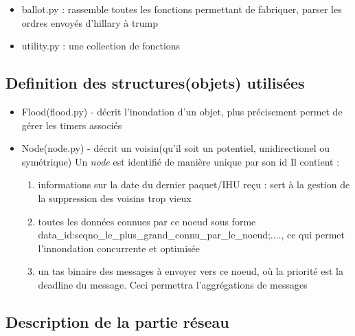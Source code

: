 \documentclass{article}
\begin{document}
\begin{itemize}
\begin{itemize}
  \item ballot.py :  rassemble toutes les fonctions permettant de fabriquer, parser les ordres envoyés d'hillary à trump
  \item utility.py : une collection de fonctions
 \end{itemize}
\end{itemize}

\subsection{Definition des structures(objets) utilisées}
\begin{itemize}
 \item Flood(flood.py) - décrit l'inondation d'un objet, plus précisement permet de gérer les timers associés
 \item Node(node.py) - décrit un voisin(qu'il soit un potentiel, unidirectionel ou symétrique)
  Un \textit{node} est identifié de manière unique par son id
  Il contient :
  \begin{enumerate}
   \item informations sur la date du dernier paquet/IHU reçu : sert à la gestion de la suppression des voisins trop vieux
   \item toutes les données connues par ce noeud sous forme {data\_id:seqno\_le\_plus\_grand\_connu\_par\_le\_noeud;....}, ce qui 
   permet l'innondation concurrente et optimisée
   \item un tas binaire des messages à envoyer vers ce noeud, où la priorité est la deadline du message. Ceci permettra l'aggrégations de messages
  \end{enumerate}
\end{itemize}

\subsection{Description de la partie réseau}
\end{document}
